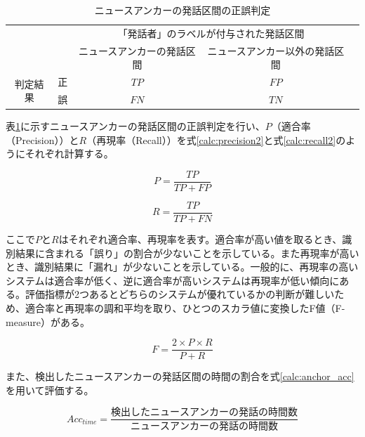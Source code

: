 \begin{table}[H]
\begin{center}
    \caption{ニュースアンカーの発話区間の正誤判定 \label{table:clustering}}
\begin{tabular}{|c|c|c|c|l}
\cline{1-4}
\multicolumn{2}{|c|}{\multirow{2}{*}{}} & \multicolumn{2}{c|}{「発話者」のラベルが付与された発話区間} &  \\ \cline{3-4}
\multicolumn{2}{|c|}{}                  & ニュースアンカーの発話区間        & ニュースアンカー以外の発話区間        &  \\ \cline{1-4}
\multirow{2}{*}{判定結果}        & 正        & $TP$                  & $FP$                   &  \\ \cline{2-4}
& 誤        & $FN$                  & $TN$                   &  \\ \cline{1-4}
\end{tabular}
\end{center}
\end{table}

表\ref{table:clustering}に示すニュースアンカーの発話区間の正誤判定を行い、$P$（適合率（Precision））と$R$（再現率（Recall））を式\ref{calc:precision2}と式\ref{calc:recall2}のようにそれぞれ計算する。

\begin{equation}
\label{calc:precision2}
P = \frac{TP}{TP + FP}
\end{equation}

\begin{equation}
\label{calc:recall2}
R = \frac{TP}{TP + FN}
\end{equation}

ここで$P$と$R$はそれぞれ適合率、再現率を表す。適合率が高い値を取るとき、識別結果に含まれる「誤り」の割合が少ないことを示している。また再現率が高いとき、識別結果に「漏れ」が少ないことを示している。一般的に、再現率の高いシステムは適合率が低く、逆に適合率が高いシステムは再現率が低い傾向にある。評価指標が2つあるとどちらのシステムが優れているかの判断が難しいため、適合率と再現率の調和平均を取り、ひとつのスカラ値に変換したF値（F-measure）がある。

\begin{equation}
\label{calc:fmeasure}
F = \frac{2 \times P \times R}{P + R}
\end{equation}

また、検出したニュースアンカーの発話区間の時間の割合を式\ref{calc:anchor_acc}を用いて評価する。

\begin{equation}
\label{calc:anchor_acc}
Acc_{time} = \frac{検出したニュースアンカーの発話の時間数}{ニュースアンカーの発話の時間数}
\end{equation}


